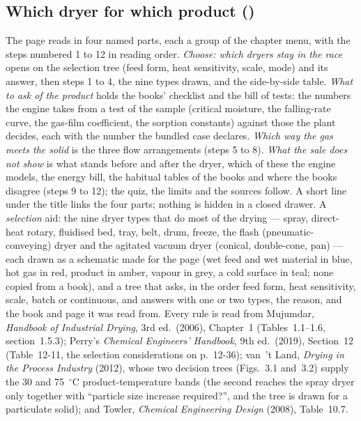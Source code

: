 \documentclass[11pt,a4paper]{article}
\begin{document}
\subsection*{Which dryer for which product \quad()}\label{sec:edu-dryer-selection}
The page reads in four named parts, each a group of the chapter menu, with the steps numbered 1 to 12 in reading order.
\emph{Choose: which dryers stay in the race} opens on the selection tree (feed form, heat sensitivity, scale, mode) and its
answer, then steps 1 to 4, the nine types drawn, and the side-by-side table.
\emph{What to ask of the product} holds the books' checklist and the bill of tests: the numbers the engine takes from a
test of the sample (critical moisture, the falling-rate curve, the gas-film coefficient, the sorption constants)
against those the plant decides, each with the number the bundled case declares.
\emph{Which way the gas meets the solid} is the three flow arrangements (steps 5 to 8).
\emph{What the sale does not show} is what stands before and after the dryer, which of these the engine models, the energy
bill, the habitual tables of the books and where the books disagree (steps 9 to 12); the quiz, the limits and the sources follow.
A short line under the title links the four parts; nothing is hidden in a closed drawer.
A \emph{selection} aid: the nine dryer types that do most of the drying ---
spray, direct-heat rotary, fluidised bed, tray, belt, drum, freeze, the flash (pneumatic-conveying)
dryer and the agitated vacuum dryer (conical, double-cone, pan) ---
each drawn as a schematic made for the page (wet feed and wet material in
blue, hot gas in red, product in amber, vapour in grey, a cold surface in
teal; none copied from a book), and a tree that
asks, in the order feed form, heat sensitivity, scale, batch or continuous,
and answers with one or two types, the reason, and the book and page it was
read from.  Every rule is read from Mujumdar, \emph{Handbook of Industrial
Drying}, 3rd ed.\ (2006), Chapter~1 (Tables~1.1--1.6, section~1.5.3);
Perry's \emph{Chemical Engineers' Handbook}, 9th ed.\ (2019), Section~12
(Table~12-11, the selection considerations on p.~12-36); van~'t Land,
\emph{Drying in the Process Industry} (2012), whose two decision trees
(Figs.~3.1 and~3.2) supply the 30 and 75~$^\circ$C product-temperature bands
(the second reaches the spray dryer only together with ``particle size
increase required?'', and the tree is drawn for a particulate solid); and
Towler, \emph{Chemical Engineering Design} (2008), Table~10.7.
\end{document}
